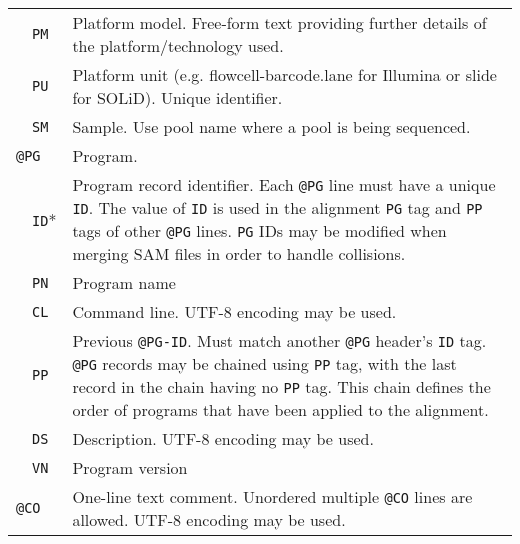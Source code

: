 \begin{table}
\begin{longtable}{|l|l|p{13.5cm}|}
  & {\tt PM} & Platform model. Free-form text providing further details of the
  platform/technology used.\\\cline{2-3}
  & {\tt PU} & Platform unit (e.g. flowcell-barcode.lane for Illumina or slide for SOLiD). Unique identifier.\\\cline{2-3}
  & {\tt SM} & Sample. Use pool name where a pool is being sequenced.\\\cline{1-3}
  \multicolumn{2}{|l}{\tt @PG} & Program. \\\cline{2-3}
  & {\tt ID}* & Program record identifier. Each {\tt @PG} line must have a unique {\tt ID}.
  	The value of {\tt ID} is used in the alignment {\tt PG} tag and {\tt PP} tags of other {\tt @PG} lines.
	{\tt PG} IDs may be modified when merging SAM files in order to handle collisions.\\\cline{2-3}
  & {\tt PN} & Program name \\\cline{2-3}
  & {\tt CL} & Command line.  UTF-8 encoding may be used. \\\cline{2-3}
  & {\tt PP} & Previous {\tt @PG-ID}. Must match another {\tt @PG} header's {\tt ID} tag.
  	{\tt @PG} records may be chained using {\tt PP} tag, with the last record in the chain
	having no {\tt PP} tag. This chain defines the order of programs that have been applied to the alignment.\\\cline{2-3}
  & {\tt DS} & Description.  UTF-8 encoding may be used.\\\cline{2-3}
  & {\tt VN} & Program version \\\cline{1-3}
  \multicolumn{2}{|l}{\tt @CO} & One-line text comment. Unordered multiple {\tt @CO} lines are allowed. UTF-8 encoding may be used.\\
  \cline{1-3}

\end{longtable}
\end{table}

